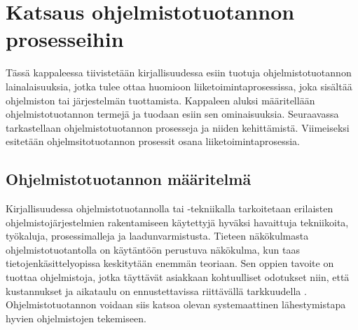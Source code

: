 \documentclass[finnish,12pt,a4paper,pdftex]{article}
\begin{document}


\section{Katsaus ohjelmistotuotannon prosesseihin}

Tässä kappaleessa tiivistetään kirjallisuudessa esiin tuotuja ohjelmistotuotannon lainalaisuuksia, jotka tulee ottaa huomioon liiketoimintaprosessissa, joka sisältää ohjelmiston tai järjestelmän tuottamista. Kappaleen aluksi määritellään ohjelmistotuotannon termejä ja tuodaan esiin sen ominaisuuksia. Seuraavassa tarkastellaan ohjelmistotuotannon prosesseja ja niiden kehittämistä. Viimeiseksi esitetään ohjelmsitotuotannon prosessit osana liiketoimintaprosessia.

\subsection{Ohjelmistotuotannon määritelmä}

Kirjallisuudessa ohjelmistotuotannolla tai -tekniikalla tarkoitetaan erilaisten ohjelmistojärjestelmien rakentamiseen käytettyjä hyväksi havaittuja tekniikoita, työkaluja, prosessimalleja ja laadunvarmistusta. Tieteen näkökulmasta ohjelmistotuotantolla on käytäntöön perustuva näkökulma, kun taas tietojenkäsittelyopissa keskitytään enemmän teoriaan. Sen oppien tavoite on tuottaa ohjelmistoja, jotka täyttävät asiakkaan kohtuulliset odotukset niin, että kustannukset ja aikataulu on ennustettavissa riittävällä tarkkuudella \citep{okaytannot}. Ohjelmistotuotannon voidaan siis katsoa olevan systemaattinen lähestymistapa hyvien ohjelmistojen tekemiseen.\\
\end{document}
